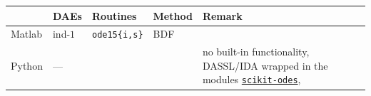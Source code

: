 \documentclass[]{book}
\theoremstyle{definition}
\theoremstyle{definition}
\theoremstyle{definition}
\theoremstyle{remark}
\begin{document}
\begin{longtable}[]{@{}lllll@{}}
\toprule
\begin{minipage}[b]{0.06\columnwidth}\raggedright\strut
\strut
\end{minipage} & \begin{minipage}[b]{0.06\columnwidth}\raggedright\strut
DAEs\strut
\end{minipage} & \begin{minipage}[b]{0.27\columnwidth}\raggedright\strut
Routines\strut
\end{minipage} & \begin{minipage}[b]{0.06\columnwidth}\raggedright\strut
Method\strut
\end{minipage} & \begin{minipage}[b]{0.37\columnwidth}\raggedright\strut
Remark\strut
\end{minipage}\tabularnewline
\midrule
\endhead
\begin{minipage}[t]{0.06\columnwidth}\raggedright\strut
Matlab\strut
\end{minipage} & \begin{minipage}[t]{0.06\columnwidth}\raggedright\strut
ind-\(1\)\strut
\end{minipage} & \begin{minipage}[t]{0.27\columnwidth}\raggedright\strut
\texttt{ode15\{i,s\}}\strut
\end{minipage} & \begin{minipage}[t]{0.06\columnwidth}\raggedright\strut
BDF\strut
\end{minipage} & \begin{minipage}[t]{0.37\columnwidth}\raggedright\strut
\strut
\end{minipage}\tabularnewline
\begin{minipage}[t]{0.06\columnwidth}\raggedright\strut
Python\strut
\end{minipage} & \begin{minipage}[t]{0.06\columnwidth}\raggedright\strut
---\strut
\end{minipage} & \begin{minipage}[t]{0.27\columnwidth}\raggedright\strut
\strut
\end{minipage} & \begin{minipage}[t]{0.06\columnwidth}\raggedright\strut
\strut
\end{minipage} & \begin{minipage}[t]{0.37\columnwidth}\raggedright\strut
no built-in functionality, DASSL/IDA wrapped in the modules
\href{https://github.com/bmcage/odes/tree/master}{\texttt{scikit-odes}},

\end{minipage}
\end{longtable}
\end{document}
